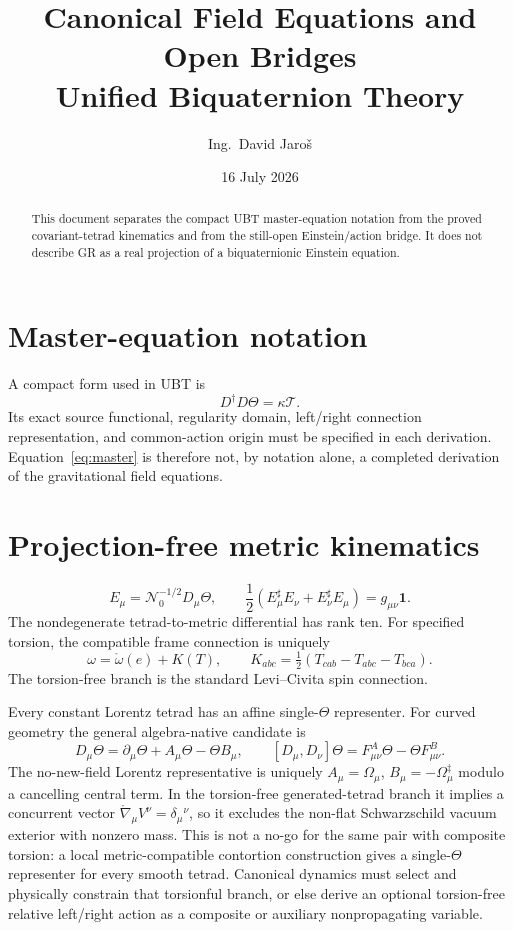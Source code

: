 \documentclass[11pt,a4paper]{article}
\title{Canonical Field Equations and Open Bridges\\\large Unified Biquaternion Theory}
\author{Ing.\ David Jaroš}
\date{16 July 2026}
\begin{document}
\maketitle

\begin{abstract}
This document separates the compact UBT master-equation notation from the
proved covariant-tetrad kinematics and from the still-open Einstein/action
bridge.  It does not describe GR as a real projection of a biquaternionic
Einstein equation.
\end{abstract}

\section{Master-equation notation}

A compact form used in UBT is
\begin{equation}\label{eq:master}
 D^\dagger D\Theta=\kappa\mathcal T.
\end{equation}
Its exact source functional, regularity domain, left/right connection
representation, and common-action origin must be specified in each derivation.
Equation~\eqref{eq:master} is therefore not, by notation alone, a completed
derivation of the gravitational field equations.

\section{Projection-free metric kinematics}

\[
 E_\mu=\mathcal N_0^{-1/2}D_\mu\Theta,
 \qquad
 \frac12(E_\mu^\sharp E_\nu+E_\nu^\sharp E_\mu)
 =g_{\mu\nu}\mathbf1.
\]
The nondegenerate tetrad-to-metric differential has rank ten.  For specified
torsion, the compatible frame connection is uniquely
\[
 \omega=\mathring\omega(e)+K(T),
 \qquad K_{abc}=\tfrac12(T_{cab}-T_{abc}-T_{bca}).
\]
The torsion-free branch is the standard Levi--Civita spin connection.

Every constant Lorentz tetrad has an affine single-$\Theta$ representer.  For
curved geometry the general algebra-native candidate is
\[
 D_\mu\Theta=\partial_\mu\Theta+A_\mu\Theta-\Theta B_\mu,
 \qquad
 [D_\mu,D_\nu]\Theta=F^A_{\mu\nu}\Theta-\Theta F^B_{\mu\nu}.
\]
The no-new-field Lorentz representative is uniquely
$A_\mu=\Omega_\mu$, $B_\mu=-\Omega_\mu^\ddagger$ modulo a cancelling central
term.  In the torsion-free generated-tetrad branch it implies a concurrent
vector $\mathring\nabla_\mu V^\nu=\delta_\mu{}^\nu$, so it excludes the
non-flat Schwarzschild vacuum exterior with nonzero mass.  This is not a no-go
for the same pair with composite torsion: a local metric-compatible contortion
construction gives a single-$\Theta$ representer for every smooth tetrad.
Canonical dynamics must select and physically constrain that torsionful branch,
or else derive an optional torsion-free relative left/right action as a
composite or auxiliary nonpropagating variable.
\end{document}
